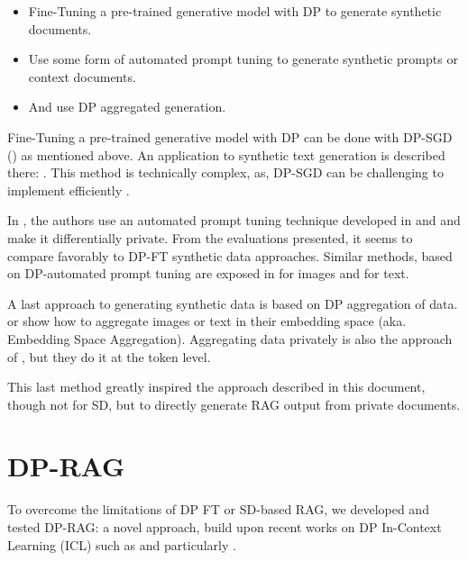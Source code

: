 \documentclass[conference]{IEEEtran}
\begin{document}
\begin{itemize}
\item
  Fine-Tuning a pre-trained generative model with DP to generate
  synthetic documents.
\item
  Use some form of automated prompt tuning to generate synthetic prompts
  or context documents.
\item
  And use DP aggregated generation.
\end{itemize}

Fine-Tuning a pre-trained generative model with DP can be done with
DP-SGD (\cite{ref-Abadi_2016, ref-Ponomareva_2023}) as mentioned
above. An application to synthetic text generation is described there:
\cite{ref-yue2023synthetictextgenerationdifferential}. This method is technically complex, as, DP-SGD can be
challenging to implement efficiently \cite{ref-bu2023differentially}.

In \cite{ref-hong2024dpoptmakelargelanguage}, the authors use an automated prompt tuning
technique developed in \cite{ref-sordoni2023jointpromptoptimizationstacked} and \cite{ref-zhou2023largelanguagemodelshumanlevel} and
make it differentially private. From the evaluations presented, it seems
to compare favorably to DP-FT synthetic data approaches. Similar
methods, based on DP-automated prompt tuning are exposed in \cite{ref-tang2024privacypreservingincontextlearningdifferentially} for images and \cite{ref-xie2024differentiallyprivatesyntheticdata} for text.

A last approach to generating synthetic data is based on DP aggregation
of data.\cite{ref-lebensold2024dprdmadaptingdiffusionmodels} or \cite{ref-wu2023privacypreservingincontextlearninglarge} show how to
aggregate images or text in their embedding space (aka. Embedding Space
Aggregation). Aggregating data privately is also the approach of \cite{ref-tang2024privacypreservingincontextlearningdifferentially}, but they do it at the token level.

This last method greatly inspired the approach described in this
document, though not for SD, but to directly generate RAG output from
private documents.

\section{DP-RAG}\label{dp-rag}

To overcome the limitations of DP FT or SD-based RAG, we developed and
tested DP-RAG: a novel approach, build upon recent works on DP
In-Context Learning (ICL) such as \cite{ref-wu2023privacypreservingincontextlearninglarge} and particularly
\cite{ref-tang2024privacypreservingincontextlearningdifferentially}.
\end{document}
